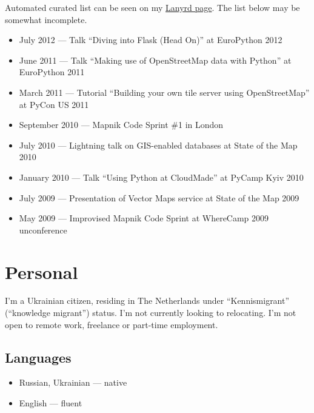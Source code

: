 \documentclass[margin]{res}
\begin{document}
\begin{resume}
Automated curated list can be seen on my \href{http://lanyrd.com/profile/mishok13/sessions/}{Lanyrd page}. The list below may be somewhat incomplete.

\begin{itemize}
\item July 2012 --- Talk ``Diving into Flask (Head On)'' at EuroPython 2012
\item June 2011 --- Talk ``Making use of OpenStreetMap data with Python'' at EuroPython 2011
\item March 2011 --- Tutorial ``Building your own tile server using OpenStreetMap'' at PyCon US 2011
\item September 2010 --- Mapnik Code Sprint \#1 in London
\item July 2010 --- Lightning talk on GIS-enabled databases at State of the Map 2010
\item January 2010 --- Talk ``Using Python at CloudMade'' at PyCamp Kyiv 2010
\item July 2009 --- Presentation of Vector Maps service at State of the Map 2009
\item May 2009 --- Improvised Mapnik Code Sprint at WhereCamp 2009 unconference
\end{itemize}

\section{Personal}

I'm a Ukrainian citizen, residing in The Netherlands under ``Kennismigrant'' (``knowledge migrant'') status. I'm not currently looking to relocating. I'm not open to remote work, freelance or part-time employment.

\subsection{Languages}
\begin{itemize} \itemsep -1pt
\item Russian, Ukrainian --- native
\item English --- fluent
\end{itemize}

\end{resume}
\end{document}

